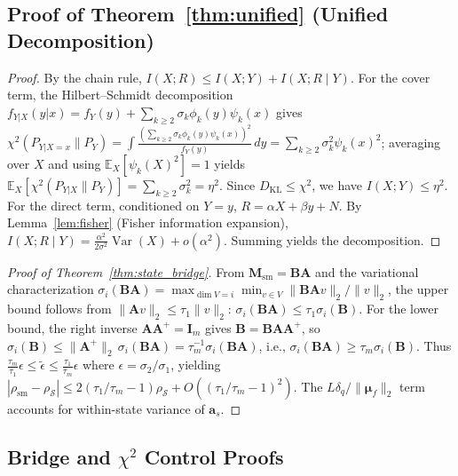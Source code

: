 \documentclass[smallextended]{svjour3}       %
\begin{document}
\subsection{Proof of Theorem~\ref{thm:unified} (Unified Decomposition)}
\label{app:unified}
\begin{proof}
By the chain rule, $I(X;R) \le I(X;Y) + I(X;R\mid Y)$. For the cover term, the Hilbert--Schmidt decomposition $f_{Y|X}(y|x) = f_Y(y) + \sum_{k\ge 2}\sigma_k\phi_k(y)\psi_k(x)$ gives $\chi^2(P_{Y|X=x}\|P_Y)=\int\frac{(\sum_{k\ge2}\sigma_k\phi_k(y)\psi_k(x))^2}{f_Y(y)}\,dy=\sum_{k\ge2}\sigma_k^2\psi_k(x)^2$; averaging over $X$ and using $\mathbb{E}_X[\psi_k(X)^2]=1$ yields $\mathbb{E}_X[\chi^2(P_{Y|X}\|P_Y)] = \sum_{k\ge 2}\sigma_k^2 = \eta^2$. Since $D_{\mathrm{KL}} \le \chi^2$, we have $I(X;Y) \le \eta^2$. For the direct term, conditioned on $Y=y$, $R = \alpha X + \beta y + N$. By Lemma~\ref{lem:fisher} (Fisher information expansion), $I(X;R\mid Y) = \frac{\alpha^2}{2\sigma^2}\operatorname{Var}(X) + o(\alpha^2)$. Summing yields the decomposition.
\end{proof}

\begin{proof}[Proof of Theorem~\ref{thm:state_bridge}]
From $\mathbf{M}_{\mathrm{sm}} = \mathbf{B}\mathbf{A}$ and the variational characterization $\sigma_i(\mathbf{B}\mathbf{A})=\max_{\dim V=i}\min_{v\in V}\|\mathbf{B}\mathbf{A}v\|_2/\|v\|_2$, the upper bound follows from $\|\mathbf{A}v\|_2\le\tau_1\|v\|_2$: $\sigma_i(\mathbf{B}\mathbf{A})\le\tau_1\sigma_i(\mathbf{B})$. For the lower bound, the right inverse $\mathbf{A}\mathbf{A}^+=\mathbf{I}_m$ gives $\mathbf{B}=\mathbf{B}\mathbf{A}\mathbf{A}^+$, so $\sigma_i(\mathbf{B})\le\|\mathbf{A}^+\|_2\,\sigma_i(\mathbf{B}\mathbf{A})=\tau_m^{-1}\sigma_i(\mathbf{B}\mathbf{A})$, i.e., $\sigma_i(\mathbf{B}\mathbf{A})\ge\tau_m\sigma_i(\mathbf{B})$. Thus $\frac{\tau_m}{\tau_1}\epsilon \le \tilde{\epsilon} \le \frac{\tau_1}{\tau_m}\epsilon$ where $\epsilon=\sigma_2/\sigma_1$, yielding $|\rho_{\mathrm{sm}}-\rho_{\mathcal{S}}| \le 2(\tau_1/\tau_m-1)\rho_{\mathcal{S}} + O((\tau_1/\tau_m-1)^2)$. The $L\delta_q/\|\boldsymbol{\mu}_f\|_2$ term accounts for within-state variance of $\mathbf{a}_s$.
\end{proof}

\subsection{Bridge and $\chi^2$ Control Proofs}
\label{app:bridge_proofs}
\end{document}
